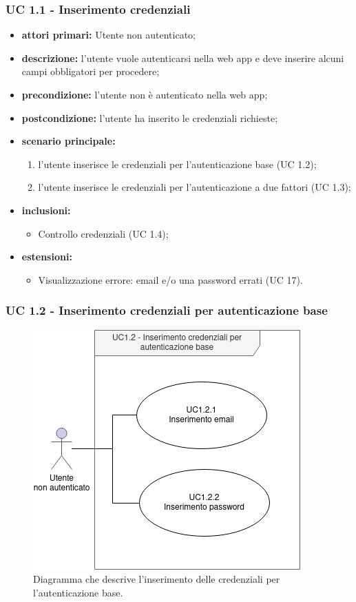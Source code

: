 		\subsubsection{UC 1.1 - Inserimento credenziali}

		\begin{itemize}
			\item \textbf{attori primari:} Utente non autenticato;
			\item \textbf{descrizione:} l'utente vuole autenticarsi nella web app e deve inserire alcuni campi obbligatori per procedere;
			\item \textbf{precondizione:} l'utente non è autenticato nella web app;
			\item \textbf{postcondizione:} l'utente ha inserito le credenziali richieste;
			\item \textbf{scenario principale:}
			\begin{enumerate}
				\item l'utente inserisce le credenziali per l'autenticazione base (UC 1.2);
				\item l'utente inserisce le credenziali per l'autenticazione a due fattori (UC 1.3);
			\end{enumerate}
			\item \textbf{inclusioni:}
				\begin{itemize}
					\item Controllo credenziali (UC 1.4);
				\end{itemize}
			\item \textbf{estensioni:}
				\begin{itemize}
					\item Visualizzazione errore: email e/o una password errati (UC 17).
				\end{itemize}
		\end{itemize}

		\subsubsection{UC 1.2 - Inserimento credenziali per autenticazione base}

		\begin{figure}[H]
			\centering
			\includegraphics[scale=0.675]{res/images/uc1.2}
			\caption{Diagramma che descrive l'inserimento delle credenziali per l'autenticazione base.}
		\end{figure}

